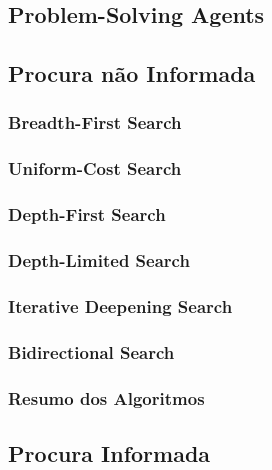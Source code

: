 \documentclass[11pt]{article}
\begin{document}
\subsection{Problem-Solving Agents}


\subsection{Procura não Informada}



\subsubsection{Breadth-First Search}



\subsubsection{Uniform-Cost Search}



\subsubsection{Depth-First Search}



\subsubsection{Depth-Limited Search}



\subsubsection{Iterative Deepening Search}



\subsubsection{Bidirectional Search}



\subsubsection*{Resumo dos Algoritmos}



\newpage
\subsection{Procura Informada}
\end{document}
